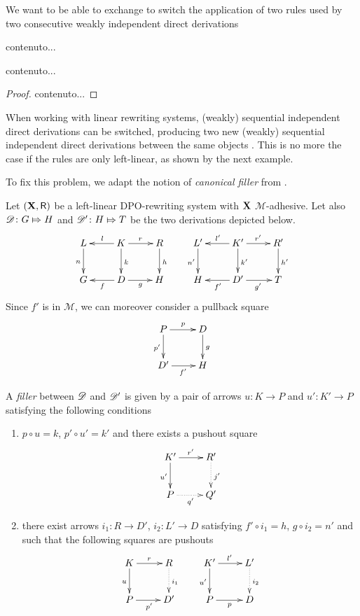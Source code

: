 We want to be able to exchange to switch the application of two rules used by two consecutive weakly independent direct derivations
\begin{definition}
	contenuto...
\end{definition}

\begin{proposition}
\end{proposition}
\begin{remark}
	contenuto...
\end{remark}
\begin{proof}
	contenuto...
\end{proof}




When working with linear rewriting systems, (weakly) sequential independent direct derivations can be switched, producing two new (weakly) sequential independent direct derivations between the same objects \cite[Thm.~$7.7$]{lack2005adhesive} . This is no more the case if the rules are only left-linear, as shown by the next example.

\begin{example}\label{ex:difficile}
\end{example}

To fix this problem, we adapt the notion of \emph{canonical filler} from \cite{heindel2009category}.






\begin{definition}\label{def:filler}
Let $(\textbf {\textup{X}}, \mathsf{R})$ be a left-linear DPO-rewriting system with $\textbf {\textup{X}}$ $\mathcal{M}$-adhesive. Let also $\mathscr{D}\colon G\Mapsto H$ and $\mathscr{D}'\colon H\Mapsto T$ be the two derivations depicted below.
\[\xymatrix{L \ar[d]_{n}& K \ar[d]^{k}\ar[l]_{l} \ar[r]^{r} & R \ar[d]^{h} & L' \ar[d]_{n'}& K' \ar[d]^{k'}\ar[l]_{l'} \ar[r]^{r'} & R' \ar[d]^{h'}\\G & \ar[l]^{f} D \ar[r]_{g}& H & H & \ar[l]^{f'} D' \ar[r]_{g'}& T}\]
Since $f'$ is in $\mathcal{M}$, we can moreover consider a pullback square
\[\xymatrix{P \ar[r]^{p} \ar[d]_{p'}& D\ar[d]^{g} \\ D' \ar[r]_{f'} & H}\]

A \emph{filler} between $\mathscr{D}$ and $\mathscr{D}'$ is  given by a pair of arrows $u\colon K\to P$ and $u'\colon K'\to P$ satisfying the following conditions
\begin{enumerate}
	\item $p\circ u = k$, $p'\circ u' = k'$ and there exists a pushout square
\[\xymatrix{K' \ar[r]^{r'} \ar[d]_{u'}& R'\ar@{.>}[d]^{j'} \\ P \ar@{.>}[r]_{q'} & Q'}\]
	\item  there exist arrows $i_1\colon R\to D'$, $i_2\colon L'\to D$ satisfying $f'\circ i_1=h$, $g\circ i_2=n'$ and such that the following squares are pushouts
\[\xymatrix{K \ar[r]^{r} \ar[d]_{u}& R \ar@{.>}[d]^{i_1} &K' \ar[r]^{l'} \ar[d]_{u'}& L'\ar@{.>}[d]^{i_2} \\P \ar[r]_{p'}& D' & P \ar[r]_{p} & D}\]
\end{enumerate}
\end{definition}


